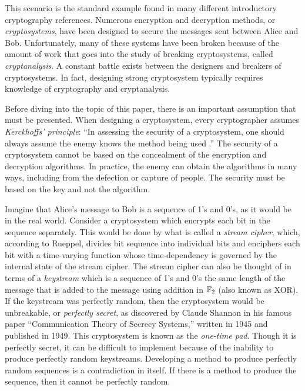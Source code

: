 \par This scenario is the standard example found in many different introductory
cryptography references. Numerous encryption and decryption methods, or {\em cryptosystems},
have been designed to secure the messages sent between Alice and Bob. Unfortunately,
many of these systems have been broken because of the amount of work that goes into
the study of breaking cryptosystems, called {\em cryptanalysis}. A constant battle
exists between the designers and breakers of cryptosystems. In fact, designing
strong cryptosystem typically requires knowledge of cryptography and cryptanalysis.

\par Before diving into the topic of this paper, there is an important assumption that must
be presented. When designing a cryptosystem, every cryptographer assumes {\em Kerckhoffs' principle}:
``In assessing the security of a cryptosystem, one should always assume the enemy knows the method
being used \cite{trappe-washington_intro-to-crypto}.'' The security of a cryptosystem
cannot be based on the concealment of the encryption and decryption algorithms. In practice,
the enemy can obtain the algorithms in many ways, including from the defection or capture
of people. The security must be based on the key and not the algorithm. 

\par Imagine that Alice's message to Bob is a sequence of 1's and 0's, as it would be
in the real world. Consider a cryptosystem which encrypts each bit in the sequence
separately. This would be done by what is called a {\em stream cipher}, which, according to Rueppel,
divides bit sequence into individual bits and enciphers each bit with a time-varying
function whose time-dependency is governed by the internal state of the stream cipher.
The stream cipher can also be thought of in terms of a {\em keystream} which is a
sequence of 1's and 0's the same length of the message that is added to the message
using addition in $\mathbb{F}_2$ (also known as XOR). If the keystream was perfectly random,
then the cryptosystem would be unbreakable, or {\em perfectly secret}, as
discovered by Claude Shannon in his famous paper ``Communication Theory of Secrecy Systems,''
written in 1945 and published in 1949. This cryptosystem is known as the {\em one-time pad}.
Though it is perfectly secret, it can be difficult to implement because of the inability
to produce perfectly random keystreams. Developing a method to produce perfectly random
sequences is a contradiction in itself. If there is a method to produce the sequence,
then it cannot be perfectly random.

